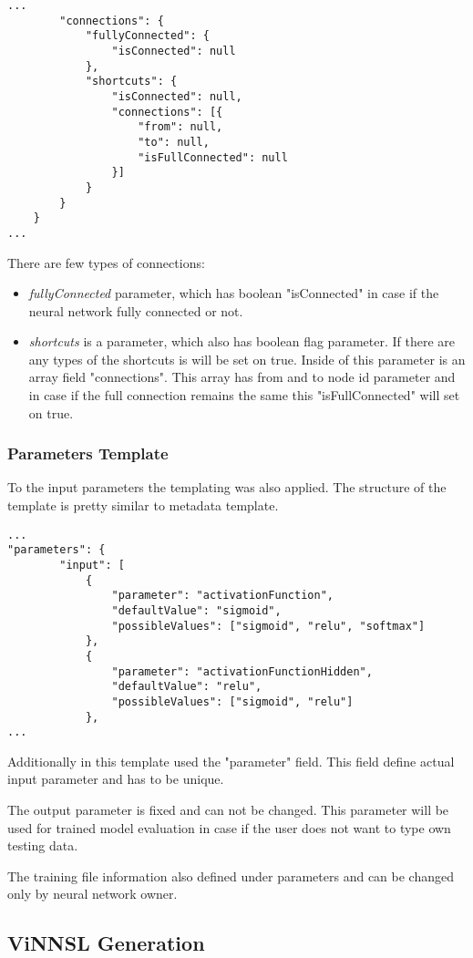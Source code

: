  \begin{lstlisting}
...
		"connections": {
			"fullyConnected": {
				"isConnected": null
			},
			"shortcuts": {
				"isConnected": null,
				"connections": [{
					"from": null,
					"to": null,
					"isFullConnected": null
				}]
			}
		}
	}
...
\end{lstlisting}

There are few types of connections:
\begin{itemize}
\item \emph{fullyConnected} parameter, which has boolean "isConnected" in case if the neural network fully connected or not.
\item \emph{shortcuts} is a parameter, which also has boolean flag parameter. If there are any types of the shortcuts is will be set on true. Inside of this parameter is an array field "connections". This array has from and to node id parameter and in case if the full connection remains the same this "isFullConnected" will set on true.
\end{itemize}

\subsubsection{Parameters Template}\label{Parameters Template}

To  the input parameters the templating was also applied. The structure of the template is pretty similar to metadata template.

 \begin{lstlisting}
...
"parameters": {
		"input": [
			{
				"parameter": "activationFunction",
				"defaultValue": "sigmoid",
				"possibleValues": ["sigmoid", "relu", "softmax"]
			},
			{
				"parameter": "activationFunctionHidden",
				"defaultValue": "relu",
				"possibleValues": ["sigmoid", "relu"]
			},
...
\end{lstlisting}

Additionally in this template used the "parameter" field. This field define actual input parameter and has to be unique.

The output parameter is fixed and can not be changed. This parameter will be used for trained model evaluation in case if the user does not want to type own testing data.

The training file information also defined under parameters and can be changed only by neural network owner.


\subsection{ViNNSL Generation}\label{ViNNSL Generation}

